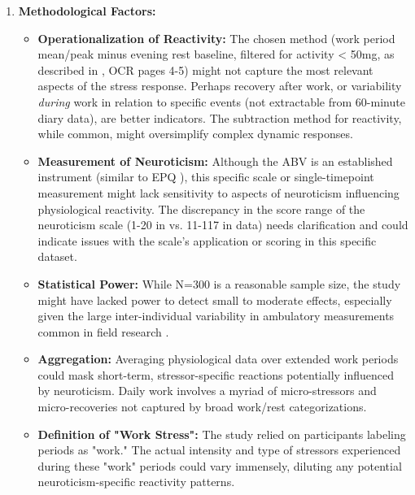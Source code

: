 \documentclass[11pt, a4paper]{report}
\begin{document}
\begin{enumerate}
    \item \textbf{Methodological Factors:}
        \begin{itemize}
            \item \textbf{Operationalization of Reactivity:} The chosen method (work period mean/peak minus evening rest baseline, filtered for activity < 50mg, as described in \cite{ThesisTempPDF}, OCR pages 4-5) might not capture the most relevant aspects of the stress response. Perhaps recovery after work, or variability \textit{during} work in relation to specific events (not extractable from 60-minute diary data), are better indicators. The subtraction method for reactivity, while common, might oversimplify complex dynamic responses.
            \item \textbf{Measurement of Neuroticism:} Although the ABV is an established instrument (similar to EPQ \cite{EysenckEysenck1975}), this specific scale or single-timepoint measurement might lack sensitivity to aspects of neuroticism influencing physiological reactivity. The discrepancy in the score range of the neuroticism scale (1-20 in \cite{ThesisTempPDF} vs. 11-117 in data) needs clarification and could indicate issues with the scale's application or scoring in this specific dataset.
            \item \textbf{Statistical Power:} While N=300 is a reasonable sample size, the study might have lacked power to detect small to moderate effects, especially given the large inter-individual variability in ambulatory measurements common in field research \cite{deGeusGevonden2024}.
            \item \textbf{Aggregation:} Averaging physiological data over extended work periods could mask short-term, stressor-specific reactions potentially influenced by neuroticism. Daily work involves a myriad of micro-stressors and micro-recoveries not captured by broad work/rest categorizations.
            \item \textbf{Definition of "Work Stress":} The study relied on participants labeling periods as "work." The actual intensity and type of stressors experienced during these "work" periods could vary immensely, diluting any potential neuroticism-specific reactivity patterns.
        \end{itemize}


\end{enumerate}
\end{document}
